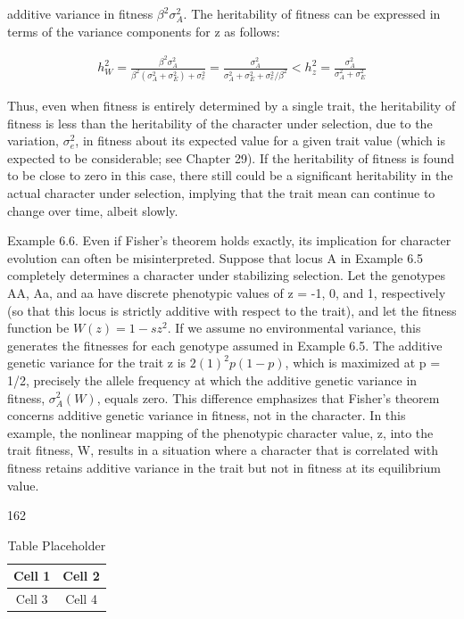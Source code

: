 \documentclass{article}
\begin{document}
additive variance in fitness  $ \beta^{2}\sigma_{A}^{2} $. The heritability of fitness can be expressed in terms of the variance components for z as follows:

\begin{equation}
\begin{align*}h_W^2=\frac{\beta^2\sigma_A^2}{\beta^2\left(\sigma_A^2+\sigma_E^2\right)+\sigma_e^2}=\frac{\sigma_A^2}{\sigma_A^2+\sigma_E^2+\sigma_e^2/\beta^2}<h_z^2=\frac{\sigma_A^2}{\sigma_A^2+\sigma_E^2}\end{align*}
\tag{6.23}
\label{eq:6_23}
\end{equation}

Thus, even when fitness is entirely determined by a single trait, the heritability of fitness is less than the heritability of the character under selection, due to the variation,  $ \sigma_{e}^{2} $, in fitness about its expected value for a given trait value (which is expected to be considerable; see Chapter 29). If the heritability of fitness is found to be close to zero in this case, there still could be a significant heritability in the actual character under selection, implying that the trait mean can continue to change over time, albeit slowly.

Example 6.6. Even if Fisher's theorem holds exactly, its implication for character evolution can often be misinterpreted. Suppose that locus A in Example 6.5 completely determines a character under stabilizing selection. Let the genotypes AA, Aa, and aa have discrete phenotypic values of z = -1, 0, and 1, respectively (so that this locus is strictly additive with respect to the trait), and let the fitness function be  $ W(z) = 1 - sz^2 $. If we assume no environmental variance, this generates the fitnesses for each genotype assumed in Example 6.5. The additive genetic variance for the trait z is  $ 2(1)^2 p(1 - p) $, which is maximized at p = 1/2, precisely the allele frequency at which the additive genetic variance in fitness,  $ \sigma_A^2(W) $, equals zero. This difference emphasizes that Fisher's theorem concerns additive genetic variance in fitness, not in the character. In this example, the nonlinear mapping of the phenotypic character value, z, into the trait fitness, W, results in a situation where a character that is correlated with fitness retains additive variance in the trait but not in fitness at its equilibrium value.

162

\begin{table}[h]
\centering
\begin{tabular}{|c|c|}
\hline
Cell 1 & Cell 2 \\
\hline
Cell 3 & Cell 4 \\
\hline
\end{tabular}
\caption{Table Placeholder}
\end{table}
\end{document}
